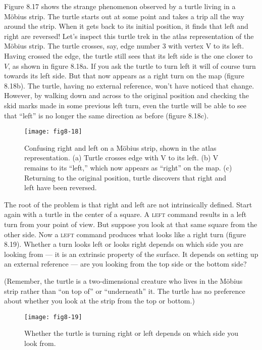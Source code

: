 \documentclass{book}
\begin{document}
Figure 8.17 shows the strange phenomenon observed by a turtle living
in a M\"obius strip. The turtle starts out at some point and takes a trip
all the way around the strip. When it gets back to its initial position,
it finds that left and right are reversed! Let's inspect this turtle trek
in the atlas representation of the M\"obius strip. The turtle crosses, say,
edge number 3 with vertex V to its left. Having crossed the edge, the
turtle still sees that its left side is the one closer to $V$, as shown in figure
8.18a. If you ask the turtle to turn left it will of course turn towards
its left side. But that now appears as a right turn on the map (figure
8.18b). The turtle, having no external reference, won't have noticed that
change. However, by walking down and across to the original position
and checking the skid marks made in some previous left turn, even the
turtle will be able to see that ``left'' is no longer the same direction as
before (figure 8.18c).

\begin{figure}
\begin{center}
\texttt{[image: fig8-18]}
\caption{Confusing right and left on a M\"obius strip, shown in the atlas representation. (a) Turtle crosses edge with V to its left. (b) V remains to its ``left,'' which now appears as ``right'' on the map. (c) Returning to the original position, turtle discovers that right and left have been reversed.}
\end{center}
\end{figure}

The root of the problem is that right and left are not intrinsically
defined. Start again with a turtle in the center of a square. A \textsc{left}
command results in a left turn from your point of view. But suppose
you look at that same square from the other side. Now a \textsc{left} command
produces what looks like a right turn (figure 8.19). Whether a turn looks
left or looks right depends on which side you are looking from --- it is
an extrinsic property of the surface. It depends on setting up an external reference --- are you looking from the top side or the bottom side?

(Remember, the turtle is a two-dimensional creature who lives in the
M\"obius strip rather than ``on top of'' or ``underneath'' it. The turtle
has no preference about whether you look at the strip from the top or
bottom.)

\begin{figure}
\begin{center}
\texttt{[image: fig8-19]}
\caption{Whether the turtle is turning right or left depends on which side you look from.}
\end{center}
\end{figure}
\end{document}
